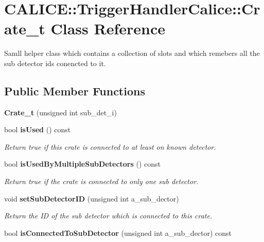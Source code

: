\section{CALICE::TriggerHandlerCalice::Crate\_\-t Class Reference}
\label{classCALICE_1_1TriggerHandlerCalice_1_1Crate__t}


Samll helper class which contains a collection of slots and which remebers all the sub detector ids conencted to it.  
\subsection*{Public Member Functions}
\begin{DoxyCompactItemize}
\item 
{\bfseries Crate\_\-t} (unsigned int sub\_\-det\_\-i)\label{classCALICE_1_1TriggerHandlerCalice_1_1Crate__t_a42dd3d017eb1e0981e92f1e57f3605c3}

\item 
bool {\bf isUsed} () const \label{classCALICE_1_1TriggerHandlerCalice_1_1Crate__t_ab0daf2d8f75bf475fb0523c860e6aed1}

\begin{DoxyCompactList}\small\item\em Return true if this crate is connected to at least on known detector. \item\end{DoxyCompactList}\item 
bool {\bf isUsedByMultipleSubDetectors} () const \label{classCALICE_1_1TriggerHandlerCalice_1_1Crate__t_a3141c360228a0a289e147c4a285bb42e}

\begin{DoxyCompactList}\small\item\em Return true if the crate is connected to only one sub detector. \item\end{DoxyCompactList}\item 
void {\bf setSubDetectorID} (unsigned int a\_\-sub\_\-dector)
\begin{DoxyCompactList}\small\item\em Return the ID of the sub detector which is connected to this crate. \item\end{DoxyCompactList}\item 
bool {\bf isConnectedToSubDetector} (unsigned int a\_\-sub\_\-dector) const \label{classCALICE_1_1TriggerHandlerCalice_1_1Crate__t_a00386bdf45d49e71cd8604393b5abc6a}


\end{DoxyCompactItemize}
